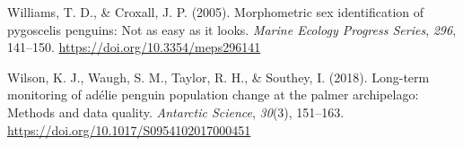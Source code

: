 \documentclass[
]{agujournal2019}
\newlength{\cslhangindent}
\newenvironment{CSLReferences}[2] %
 {\begin{list}{}{%
  \setlength{\itemindent}{0pt}
  \setlength{\leftmargin}{0pt}
  \setlength{\parsep}{0pt}
  \ifodd #1
   \setlength{\leftmargin}{\cslhangindent}
   \setlength{\itemindent}{-1\cslhangindent}
  \fi
  \setlength{\itemsep}{#2\baselineskip}}}
 {\end{list}}
\begin{document}
\begin{CSLReferences}{1}{0}
Williams, T. D., \& Croxall, J. P. (2005). Morphometric sex
identification of pygoscelis penguins: Not as easy as it looks.
\emph{Marine Ecology Progress Series}, \emph{296}, 141--150.
\url{https://doi.org/10.3354/meps296141}

Wilson, K. J., Waugh, S. M., Taylor, R. H., \& Southey, I. (2018).
Long-term monitoring of adélie penguin population change at the palmer
archipelago: Methods and data quality. \emph{Antarctic Science},
\emph{30}(3), 151--163. \url{https://doi.org/10.1017/S0954102017000451}

\end{CSLReferences}
\end{document}
